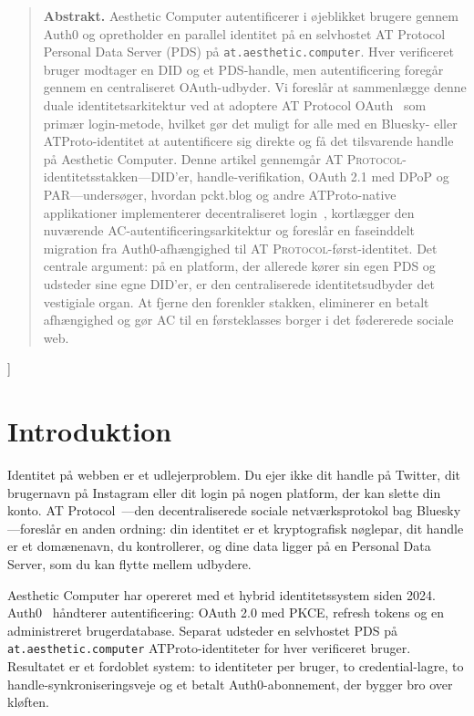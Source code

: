 \documentclass[10pt,letterpaper,twocolumn]{article}
\newcommand{\atproto}{\textsc{AT Protocol}}
\begin{document}
{\begin{quote}
\small\noindent\textbf{Abstrakt.}
Aesthetic Computer autentificerer i øjeblikket brugere gennem Auth0 og opretholder en parallel identitet på en selvhostet AT Protocol Personal Data Server (PDS) på \texttt{at.aesthetic.computer}. Hver verificeret bruger modtager en DID og et PDS-handle, men autentificering foregår gennem en centraliseret OAuth-udbyder. Vi foreslår at sammenlægge denne duale identitetsarkitektur ved at adoptere AT Protocol OAuth~\citep{atproto2024oauth} som primær login-metode, hvilket gør det muligt for alle med en Bluesky- eller ATProto-identitet at autentificere sig direkte og få det tilsvarende handle på Aesthetic Computer. Denne artikel gennemgår \atproto{}-identitetsstakken---DID'er, handle-verifikation, OAuth 2.1 med DPoP og PAR---undersøger, hvordan pckt.blog og andre ATProto-native applikationer implementerer decentraliseret login~\citep{pcktblog2025}, kortlægger den nuværende AC-autentificeringsarkitektur og foreslår en faseinddelt migration fra Auth0-afhængighed til \atproto{}-først-identitet. Det centrale argument: på en platform, der allerede kører sin egen PDS og udsteder sine egne DID'er, er den centraliserede identitetsudbyder det vestigiale organ. At fjerne den forenkler stakken, eliminerer en betalt afhængighed og gør AC til en førsteklasses borger i det fødererede sociale web.
\end{quote}
\vspace{0.5em}
}]


\section{Introduktion}

Identitet på webben er et udlejerproblem. Du ejer ikke dit handle på Twitter, dit brugernavn på Instagram eller dit login på nogen platform, der kan slette din konto. AT Protocol~\citep{atproto2024spec}---den decentraliserede sociale netværksprotokol bag Bluesky---foreslår en anden ordning: din identitet er et kryptografisk nøglepar, dit handle er et domænenavn, du kontrollerer, og dine data ligger på en Personal Data Server, som du kan flytte mellem udbydere.

Aesthetic Computer har opereret med et hybrid identitetssystem siden 2024. Auth0~\citep{auth0spa} håndterer autentificering: OAuth 2.0 med PKCE, refresh tokens og en administreret brugerdatabase. Separat udsteder en selvhostet PDS på \texttt{at.aesthetic.computer} ATProto-identiteter for hver verificeret bruger. Resultatet er et fordoblet system: to identiteter per bruger, to credential-lagre, to handle-synkroniseringsveje og et betalt Auth0-abonnement, der bygger bro over kløften.
\end{document}
